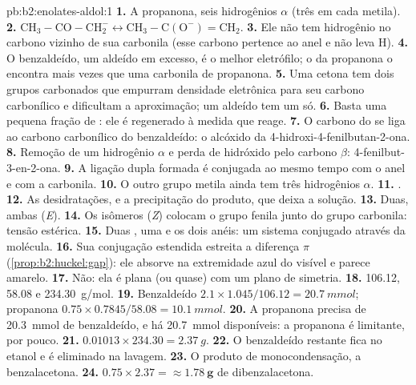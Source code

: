 \begin{solution}{pb:b2:enolates-aldol:1}
\textbf{1.} A propanona, seis hidrogênios $\alpha$ (três em cada metila).
\textbf{2.} $\mathrm{CH_3{-}CO{-}CH_2^-} \leftrightarrow \mathrm{CH_3{-}C(O^-){=}CH_2}$.
\textbf{3.} Ele não tem hidrogênio no carbono vizinho de sua carbonila (esse carbono pertence ao anel e
não leva H).
\textbf{4.} O benzaldeído, um aldeído em excesso, é o melhor eletrófilo; o  da propanona o
encontra mais vezes que uma carbonila de propanona.
\textbf{5.} Uma cetona tem dois grupos carbonados que empurram densidade eletrônica para seu carbono
carbonílico e dificultam a aproximação; um aldeído tem um só.
\textbf{6.} Basta uma pequena fração de : ele é regenerado à medida que reage.
\textbf{7.} O carbono do  se liga ao carbono carbonílico do benzaldeído: o alcóxido da
4-hidroxi-4-fenilbutan-2-ona.
\textbf{8.} Remoção de um hidrogênio $\alpha$ e perda de hidróxido pelo carbono $\beta$: 4-fenilbut-3-en-2-ona.
\textbf{9.} A ligação dupla formada é conjugada ao mesmo tempo com o anel e com a carbonila.
\textbf{10.} O outro grupo metila ainda tem três hidrogênios $\alpha$.
\textbf{11.} .
\textbf{12.} As desidratações, e a precipitação do produto, que deixa a solução.
\textbf{13.} Duas, ambas (\textit{E}).
\textbf{14.} Os isômeros (\textit{Z}) colocam o grupo fenila junto do grupo carbonila: tensão estérica.
\textbf{15.} Duas , uma  e os dois anéis: um sistema conjugado através da molécula.
\textbf{16.} Sua conjugação estendida estreita a diferença $\pi$ (\cref{prop:b2:huckel:gap}): ele absorve na
extremidade azul do visível e parece amarelo.
\textbf{17.} Não: ela é plana (ou quase) com um plano de simetria.
\textbf{18.} 106.12, 58.08 e \qty{234.30}{g/mol}.
\textbf{19.} Benzaldeído $2.1 \times 1.045/106.12 = \qty{20.7}{mmol}$; propanona $0.75 \times
0.7845/58.08 = \qty{10.1}{mmol}$.
\textbf{20.} A propanona precisa de \qty{20.3}{mmol} de benzaldeído, e há \qty{20.7}{mmol} disponíveis:
a propanona é limitante, por pouco.
\textbf{21.} $0.01013 \times 234.30 = \qty{2.37}{g}$.
\textbf{22.} O benzaldeído restante fica no etanol e é eliminado na lavagem.
\textbf{23.} O produto de monocondensação, a benzalacetona.
\textbf{24.} $0.75 \times 2.37 = \boldsymbol{\approx \qty{1.78}{g}}$ de dibenzalacetona.
\end{solution}
